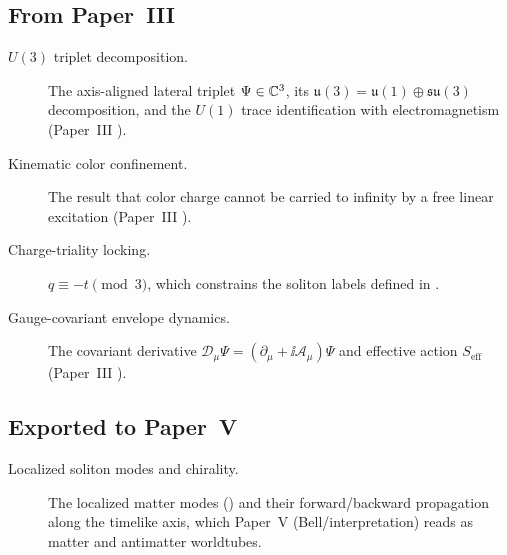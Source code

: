 \subsection*{From Paper~III}
\begin{description}
  \item[\normalfont $U(3)$ triplet decomposition.]
  The axis-aligned lateral triplet $\Psi\in\mathbb{C}^3$, its $\mathfrak{u}(3)=\mathfrak{u}(1)
  \oplus\mathfrak{su}(3)$ decomposition, and the $U(1)$ trace identification with
  electromagnetism (Paper~III ).
  \item[\normalfont Kinematic color confinement.]
  The result that color charge cannot be carried to infinity by a free linear excitation
  (Paper~III ).
  \item[\normalfont Charge-triality locking.]
  $q\equiv -t\pmod{3}$, which constrains the soliton labels defined in
  .
  \item[\normalfont Gauge-covariant envelope dynamics.]
  The covariant derivative $\mathcal{D}_\mu\Psi = (\partial_\mu + \ii\mathcal{A}_\mu)\Psi$
  and effective action $S_{\text{eff}}$ (Paper~III ).
\end{description}

\subsection*{Exported to Paper~V}
\begin{description}
  \item[\normalfont Localized soliton modes and chirality.]
  The localized matter modes () and their forward/backward propagation along
  the timelike axis, which Paper~V (Bell/interpretation) reads as matter and antimatter
  worldtubes.
\end{description}